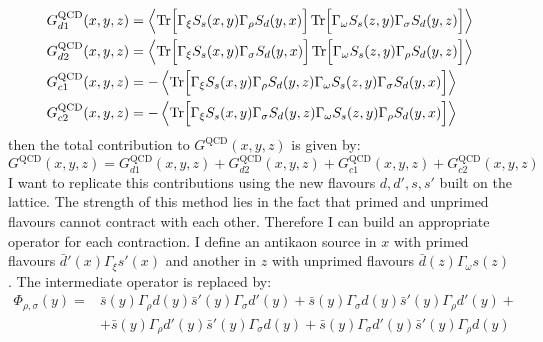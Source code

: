 \documentclass[english, LaM, oneside, noexaminfo]{sapthesis}
\newcommand{\la}{\langle}
\newcommand{\ra}{\rangle}
\newcommand{\tr}{\text{Tr}}
\begin{document}
\begin{equation}\label{eq:wick-contractions-general}
    \begin{split}
        & G_{d1}^\text{QCD}(x,y,z) = \left\la \tr \Big[ \Gamma_\xi S_{s} (x,y) \Gamma_\rho S_{d} (y,x) \Big] \hspace*{.5mm} \tr \Big[ \Gamma_\omega S_{s} (z,y) \Gamma_\sigma S_{d} (y,z) \Big] \right\ra \\
        & G_{d2}^\text{QCD}(x,y,z) = \left\la \tr \Big[ \Gamma_\xi S_{s} (x,y) \Gamma_\sigma S_{d} (y,x) \Big] \hspace*{.5mm} \tr \Big[ \Gamma_\omega S_{s} (z,y) \Gamma_\rho S_{d} (y,z) \Big] \right\ra \\
        & G_{c1}^\text{QCD}(x,y,z) = - \left\la \tr \Big[ \Gamma_\xi S_{s} (x,y) \Gamma_\rho S_{d} (y,z) \Gamma_\omega S_{s} (z,y) \Gamma_\sigma S_{d} (y,x) \Big] \right\ra \\
        & G_{c2}^\text{QCD}(x,y,z) = - \left\la \tr \Big[ \Gamma_\xi S_{s} (x,y) \Gamma_\sigma S_{d} (y,z) \Gamma_\omega S_{s} (z,y) \Gamma_\rho S_{d} (y,x) \Big] \right\ra \\
    \end{split}
\end{equation}
then the total contribution to $G^\text{QCD}(x,y,z)$ is given by:
\begin{equation*}
    G^\text{QCD}(x,y,z) = G_{d1}^\text{QCD}(x,y,z) + G_{d2}^\text{QCD}(x,y,z) + G_{c1}^\text{QCD}(x,y,z) + G_{c2}^\text{QCD}(x,y,z)
\end{equation*}
I want to replicate this contributions using the new flavours $d,d',s,s'$ built on the lattice.
The strength of this method lies in the fact that primed and unprimed flavours cannot contract with each other.
Therefore I can build an appropriate operator for each contraction.
I define an antikaon source in $x$ with primed flavours $\bar d' (x) \Gamma_\xi s'(x)$ and another in $z$ with unprimed flavours $\bar d (z) \Gamma_\omega s(z)$.
The intermediate operator is replaced by: 
\begin{equation*}
    \begin{aligned}
        \Phi_{\rho,\sigma}(y) = 
        & \bar s(y) \Gamma_\rho d(y) \bar s'(y) \Gamma_\sigma d'(y) + \bar s(y) \Gamma_\sigma d(y) \bar s'(y) \Gamma_\rho d'(y) + \\
        & + \bar s(y) \Gamma_\rho d'(y) \bar s'(y) \Gamma_\sigma d(y) + \bar s(y) \Gamma_\sigma d'(y) \bar s'(y) \Gamma_\rho d(y)
    \end{aligned}
\end{equation*}
\end{document}
